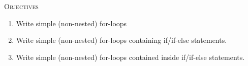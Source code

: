


\renewcommand\TITLE{Assignment 8}
\usepackage{import}


\topmatter

\textsc{Objectives}
 \begin{enumerate}[nosep]
   \item Write simple (non-nested) for-loops
   \item Write simple (non-nested) for-loops containing if/if-else statements.
   \item Write simple (non-nested) for-loops contained inside if/if-else
         statements.
 \end{enumerate}




